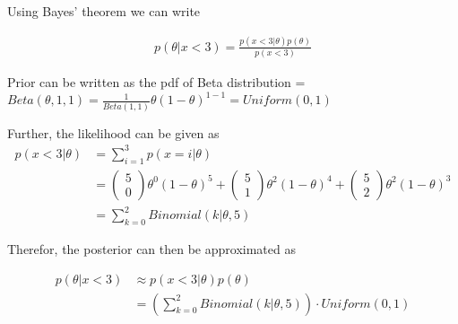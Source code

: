 Using Bayes' theorem we can write

\begin{align*}
	p(\theta | x < 3) = \frac{p(x < 3 | \theta)p(\theta)}{p(x < 3)}
\end{align*}

Prior can be written as the pdf of Beta distribution = $Beta(\theta, 1, 1) = \frac{1}{Beta(1, 1)} \theta (1 - \theta)^{1- 1} = Uniform(0, 1)$ 

Further, the likelihood can be given as 
\begin{align*}
	p(x < 3 | \theta) & = \sum_{i=1}^{3}p(x = i | \theta) \\
	& = \begin{pmatrix} 5 \\ 0 \end{pmatrix}\theta^{0} (1 - \theta)^{5} + \begin{pmatrix} 5 \\ 1 \end{pmatrix}\theta^{2} (1 - \theta)^{4} + \begin{pmatrix} 5 \\ 2 \end{pmatrix}\theta^{2} (1 - \theta)^{3} \\
	& = \sum_{k=0}^{2} Binomial(k | \theta, 5)
\end{align*}

Therefor, the posterior can then be approximated as

\begin{align*}
	p(\theta | x < 3) & \approx p(x < 3 | \theta)p(\theta) \\
	& = (\sum_{k=0}^{2} Binomial(k | \theta, 5)) \cdot Uniform(0, 1)
\end{align*}